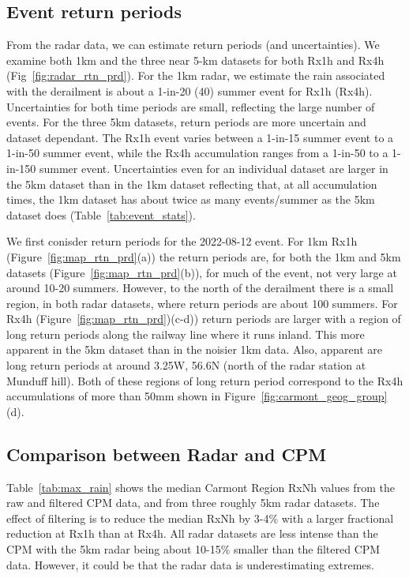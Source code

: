 \documentclass[11pt,a4paper]{article}
\begin{document}
\subsection{Event return periods}
From the radar data, we can estimate return periods (and uncertainties). We examine both 1km and the three near 5-km datasets for both Rx1h and Rx4h (Fig~\ref{fig:radar_rtn_prd}). For the 1km radar, we estimate the rain associated with the derailment is about a 1-in-20 (40) summer event for Rx1h (Rx4h). Uncertainties for both time periods are small, reflecting the large number of events. For the three 5km datasets, return periods are more uncertain and dataset dependant. The Rx1h event varies between a 1-in-15 summer event to a 1-in-50 summer event, while the Rx4h accumulation ranges from a 1-in-50 to a 1-in-150 summer event. Uncertainties even for an individual dataset are larger in the 5km dataset than in the 1km dataset reflecting that, at all accumulation times, the 1km dataset has about twice as many events/summer as the  5km dataset does (Table~\ref{tab:event_stats}).

We first conisder return periods for the 2022-08-12 event. For 1km Rx1h (Figure~\ref{fig:map_rtn_prd}(a)) the return periods are, for both the 1km and 5km datasets (Figure~\ref{fig:map_rtn_prd}(b)), for much of the event, not very large at around 10-20 summers. However,  to the north of the derailment there is a small region, in both radar datasets, where return periods are about 100 summers.   For Rx4h (Figure~\ref{fig:map_rtn_prd})(c-d)) return periods are larger with a region of long return periods along the railway line where it runs inland. This more apparent in the 5km dataset than in the noisier 1km data. Also, apparent are long return periods at around 3.25W, 56.6N (north of the radar station at Munduff hill). Both of these regions of long return period correspond to the Rx4h accumulations of more than 50mm shown in Figure~\ref{fig:carmont_geog_group}(d). 

\subsection{Comparison between Radar and  CPM}

Table~\ref{tab:max_rain} shows the median Carmont Region RxNh values from the raw and filtered CPM data, and from three roughly 5km radar datasets.
 The effect of filtering is to reduce the median RxNh by 3-4\% with a larger fractional reduction at Rx1h than at Rx4h.  All  radar datasets are less intense than the CPM  with the 5km radar being about 10-15\% smaller than the filtered CPM data.  However, it could be that the radar data is underestimating extremes.
 
\end{document}
